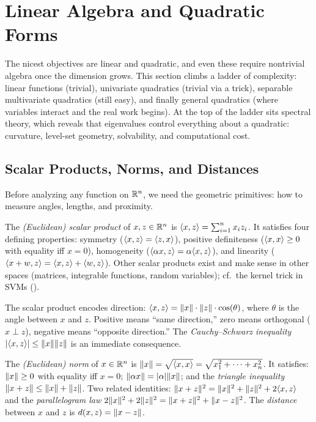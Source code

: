 \section{Linear Algebra and Quadratic Forms}\label{sec:spectral}

The nicest objectives are linear and quadratic, and even these require nontrivial algebra once the dimension grows.
This section climbs a ladder of complexity: linear functions (trivial), univariate quadratics (trivial via a trick), separable multivariate quadratics (still easy), and finally general quadratics (where variables interact and the real work begins).
At the top of the ladder sits spectral theory, which reveals that eigenvalues control everything about a quadratic: curvature, level-set geometry, solvability, and computational cost.


\subsection{Scalar Products, Norms, and Distances}\label{sec:inner-product}

Before analyzing any function on $\mathbb{R}^n$, we need the geometric primitives: how to measure angles, lengths, and proximity.

\begin{definition}\label{def:scalar-product}
	The \emph{(Euclidean) scalar product} of $x, z \in \mathbb{R}^n$ is
	$\langle x, z\rangle = \sum_{i=1}^{n} x_i z_i$.
	It satisfies four defining properties:
	symmetry ($\langle x, z\rangle = \langle z, x\rangle$),
	positive definiteness ($\langle x, x\rangle \geq 0$ with equality iff $x = 0$),
	homogeneity ($\langle\alpha x, z\rangle = \alpha \langle x, z\rangle$),
	and linearity ($\langle x + w, z\rangle = \langle x, z\rangle + \langle w, z\rangle$).
	Other scalar products exist and make sense in other spaces (matrices, integrable functions, random variables); cf.\ the kernel trick in SVMs ().
\end{definition}

The scalar product encodes direction: $\langle x, z\rangle = \lVert x\rVert \cdot \lVert z\rVert \cdot \cos(\theta)$, where $\theta$ is the angle between $x$ and $z$.
Positive means ``same direction,'' zero means orthogonal ($x \perp z$), negative means ``opposite direction.''
The \emph{Cauchy--Schwarz inequality} $\lvert\langle x, z\rangle\rvert \leq \lVert x\rVert \lVert z\rVert$ is an immediate consequence.

\begin{definition}\label{def:norm-distance}
	The \emph{(Euclidean) norm} of $x \in \mathbb{R}^n$ is $\lVert x\rVert = \sqrt{\langle x, x\rangle} = \sqrt{x_1^2 + \cdots + x_n^2}$.
	It satisfies: $\lVert x\rVert \geq 0$ with equality iff $x = 0$; $\lVert\alpha x\rVert = \lvert\alpha\rvert \lVert x\rVert$; and the \emph{triangle inequality} $\lVert x + z\rVert \leq \lVert x\rVert + \lVert z\rVert$.
	Two related identities: $\lVert x + z\rVert^2 = \lVert x\rVert^2 + \lVert z\rVert^2 + 2\langle x, z\rangle$ and the \emph{parallelogram law} $2\lVert x\rVert^2 + 2\lVert z\rVert^2 = \lVert x + z\rVert^2 + \lVert x - z\rVert^2$.
	The \emph{distance} between $x$ and $z$ is $d(x, z) = \lVert x - z\rVert$.
\end{definition}

